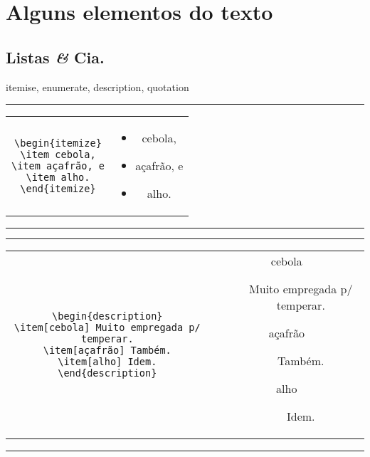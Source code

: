 \section{Alguns elementos do texto}

\subsection[Listas]{Listas {\it \&} Cia.}

itemise, enumerate, description, quotation

\begin{center}\footnotesize\hrule\smallskip
\begin{tabular}{c|c}
\begin{minipage}{.465\textwidth}
\begin{verbatim}
\begin{itemize}
\item cebola,
\item açafrão, e
\item alho.
\end{itemize}
\end{verbatim}
\end{minipage} &
\begin{minipage}{.465\textwidth}
\begin{itemize}
\item cebola,
\item açafrão, e
\item alho.
\end{itemize}
\end{minipage}
\end{tabular}
\smallskip\hrule
\end{center}


\begin{center}\footnotesize\hrule\smallskip
\begin{tabular}{c|c}
\begin{minipage}{.465\textwidth}
\begin{verbatim}
\begin{description}
\item[cebola] Muito empregada p/ temperar.
\item[açafrão] Também.
\item[alho] Idem.
\end{description}
\end{verbatim}
\end{minipage} &
\begin{minipage}{.465\textwidth}
\begin{description}
\item[cebola] Muito empregada p/ temperar.
\item[açafrão] Também.
\item[alho] Idem.
\end{description}
\end{minipage}
\end{tabular}
\smallskip\hrule
\end{center}

